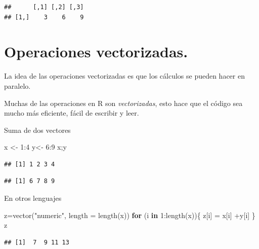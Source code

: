 \documentclass[
  12pt,
]{book}
\newenvironment{Shaded}{\begin{snugshade}}{\end{snugshade}}
\newcommand{\AttributeTok}[1]{\textcolor[rgb]{0.77,0.63,0.00}{#1}}
\newcommand{\ControlFlowTok}[1]{\textcolor[rgb]{0.13,0.29,0.53}{\textbf{#1}}}
\newcommand{\DecValTok}[1]{\textcolor[rgb]{0.00,0.00,0.81}{#1}}
\newcommand{\FunctionTok}[1]{\textcolor[rgb]{0.00,0.00,0.00}{#1}}
\newcommand{\NormalTok}[1]{#1}
\newcommand{\OtherTok}[1]{\textcolor[rgb]{0.56,0.35,0.01}{#1}}
\newcommand{\SpecialCharTok}[1]{\textcolor[rgb]{0.00,0.00,0.00}{#1}}
\newcommand{\StringTok}[1]{\textcolor[rgb]{0.31,0.60,0.02}{#1}}
\begin{document}
\begin{verbatim}
##      [,1] [,2] [,3]
## [1,]    3    6    9
\end{verbatim}

\hypertarget{operaciones-vectorizadas.}{%
\chapter{\texorpdfstring{\textbf{Operaciones vectorizadas.}}{Operaciones vectorizadas.}}\label{operaciones-vectorizadas.}}

La idea de las operaciones vectorizadas es que los cálculos se pueden hacer en paralelo.

Muchas de las operaciones en R son \emph{vectorizadas}, esto hace que el código sea mucho más eficiente, fácil de escribir y leer.

Suma de dos vectores

\begin{Shaded}
\begin{Highlighting}[]
\NormalTok{x }\OtherTok{\textless{}{-}} \DecValTok{1}\SpecialCharTok{:}\DecValTok{4}
\NormalTok{y}\OtherTok{\textless{}{-}} \DecValTok{6}\SpecialCharTok{:}\DecValTok{9}
\NormalTok{x;y}
\end{Highlighting}
\end{Shaded}

\begin{verbatim}
## [1] 1 2 3 4
\end{verbatim}

\begin{verbatim}
## [1] 6 7 8 9
\end{verbatim}

En otros lenguajes

\begin{Shaded}
\begin{Highlighting}[]
\NormalTok{z}\OtherTok{=}\FunctionTok{vector}\NormalTok{(}\StringTok{"numeric"}\NormalTok{, }\AttributeTok{length =} \FunctionTok{length}\NormalTok{(x))}
\ControlFlowTok{for}\NormalTok{ (i }\ControlFlowTok{in} \DecValTok{1}\SpecialCharTok{:}\FunctionTok{length}\NormalTok{(x))\{}
\NormalTok{  z[i] }\OtherTok{=}\NormalTok{ x[i] }\SpecialCharTok{+}\NormalTok{y[i]}
\NormalTok{\}}
\NormalTok{z}
\end{Highlighting}
\end{Shaded}

\begin{verbatim}
## [1]  7  9 11 13
\end{verbatim}
\end{document}
